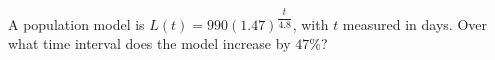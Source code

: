 A population model is $ L(t)=990(1.47)^{\dfrac{t}{4.8}}$, with $ t $ measured in days. Over what time interval does the model increase by $ 47\%$?
